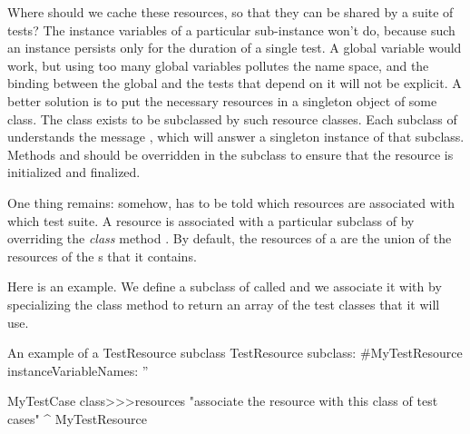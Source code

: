 \documentclass[a4paper,10pt,twoside]{book}
\begin{document}
Where should we cache these resources, so that they can be shared by a suite of tests?
The instance variables of a particular  sub-instance won't do, because such an instance persists only for the duration of a single test.
A global variable would work, but using too many global variables pollutes the name space, and the binding between the global and the tests that depend on it will not be explicit.
A better solution is to put the necessary resources in a singleton object of some class.
The class  exists to be subclassed by such resource classes.
Each subclass of  understands the message  , which will answer a singleton instance of that subclass.
Methods  and  should be overridden in the subclass to ensure that the resource is initialized and finalized.

One thing remains: somehow, \sunit has to be told which resources are associated with which test suite.
A resource is associated
with a particular subclass of  
by overriding the \emph{class} method .
By default, the resources of 
a  are
the union of the resources of
the s that it contains.

Here is an example. 
We define a subclass of  called
 and we associate it with 
by specializing the class method  to return an array
of the test classes that it will use.

\begin{classdef}[mytestresource]{An example of a TestResource subclass}
TestResource subclass: #MyTestResource
	instanceVariableNames: ''

MyTestCase class>>>resources
	"associate the resource with this class of test cases"
	^{ MyTestResource }
\end{classdef}




\end{document}

